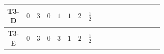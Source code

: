\documentclass[8pt]{article}
\begin{document}
\begin{landscape}
\begin{longtable}{@{}cccccccc >{\raggedright\arraybackslash}p{0.21\linewidth} >{\raggedright\arraybackslash}p{0.21\linewidth} >{\raggedright\arraybackslash}p{0.21\linewidth}@{}}
\midrule
T3-D & $0$ & $3$ & $0$ & $1$ & $1$ & $2$ & $\frac{1}{2}$ & \scriptsize\adjustbox{max width=\linewidth}{$\begin{gathered} +D_{\mu _1}\left(S_2\right){}^{\dagger } D_{\mu _1}\left(S_2\right)\end{gathered}$} & \scriptsize\adjustbox{max width=\linewidth}{$\begin{gathered} -\overline{F_{j_1,r_1}}\, F_{j_1,r_1} M_F\end{gathered}$} & \scriptsize\adjustbox{max width=\linewidth}{$\begin{gathered} +i \overline{F_{j_1,r_1}}\, \gamma ^{\mu _1}\, D_{\mu _1}\left(F_{j_1,r_1}\right)\end{gathered}$} \\
\midrule
T3-E & $0$ & $3$ & $0$ & $3$ & $1$ & $2$ & $\frac{1}{2}$ & \scriptsize\adjustbox{max width=\linewidth}{$\begin{gathered} +D_{\mu _1}\left(S_{2,j_1}\right){}^{\dagger } D_{\mu _1}\left(S_{2,j_1}\right)\end{gathered}$} & \scriptsize\adjustbox{max width=\linewidth}{$\begin{gathered} -\overline{F_{j_1,r_1}}\, F_{j_1,r_1} M_F\end{gathered}$} & \scriptsize\adjustbox{max width=\linewidth}{$\begin{gathered} +i \overline{F_{j_1,r_1}}\, \gamma ^{\mu _1}\, D_{\mu _1}\left(F_{j_1,r_1}\right)\end{gathered}$} \\
\midrule
\bottomrule
\end{longtable}
\clearpage

\end{landscape}
\end{document}
